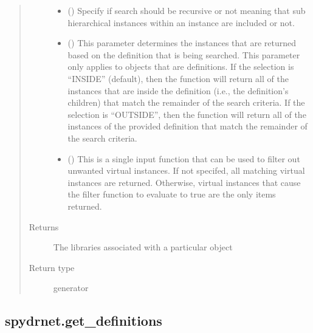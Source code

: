 \documentclass[letterpaper,10pt,english,openany,oneside]{sphinxmanual}
\begin{document}
\begin{fulllineitems}
\begin{quote}
\begin{description}
\begin{itemize}
\item {} 
 () \textendash{} Specify if search should be recursive or not meaning that sub hierarchical instances within an instance are
included or not.

\item {} 
 () \textendash{} This parameter determines the instances that are returned based on the definition that is being searched. This
parameter only applies to objects that are definitions. If the selection is “INSIDE” (default), then the
function will return all of the instances that are inside the definition (i.e., the definition’s children) that
match the remainder of the search criteria. If the selection is “OUTSIDE”, then the function will return all of
the instances of the provided definition that match the remainder of the search criteria.

\item {} 
 () \textendash{} This is a single input function that can be used to filter out unwanted virtual instances. If not specifed, all
matching virtual instances are returned. Otherwise, virtual instances that cause the filter function to evaluate
to true are the only items returned.

\end{itemize}

\item[{Returns}] \leavevmode
{} \textendash{} The libraries associated with a particular object

\item[{Return type}] \leavevmode
generator

\end{description}\end{quote}

\end{fulllineitems}



\subsection{spydrnet.get\_definitions}
\label{\detokenize{reference/classes/generated/spydrnet.get_definitions:spydrnet-get-definitions}}\label{\detokenize{reference/classes/generated/spydrnet.get_definitions::doc}}
\end{document}
